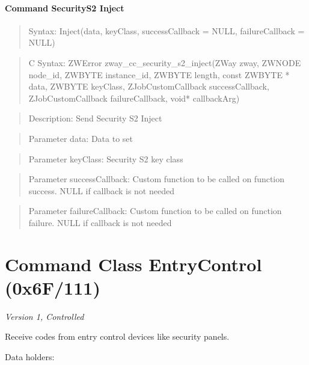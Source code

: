 \paragraph{Command SecurityS2 Inject}
\begin{quote}Syntax: Inject(data, keyClass, successCallback = NULL, failureCallback = NULL)\end{quote}
\begin{quote}C Syntax: ZWError zway\_cc\_security\_s2\_inject(ZWay zway, ZWNODE node\_id, ZWBYTE instance\_id, ZWBYTE length, const ZWBYTE * data, ZWBYTE keyClass, ZJobCustomCallback successCallback, ZJobCustomCallback failureCallback, void* callbackArg)\end{quote}
\begin{quote}Description: Send Security S2 Inject\end{quote}
\begin{quote}Parameter data: Data to set\end{quote}
\begin{quote}Parameter keyClass: Security S2 key class\end{quote}
\begin{quote}Parameter successCallback: Custom function to be called on function success. NULL if callback is not needed\end{quote}
\begin{quote}Parameter failureCallback: Custom function to be called on function failure. NULL if callback is not needed\end{quote}



\section{Command Class EntryControl (0x6F/111)}

\textit{Version 1, Controlled}
\newline

Receive codes from entry control devices like security panels.
\newline

\noindent
Data holders:

